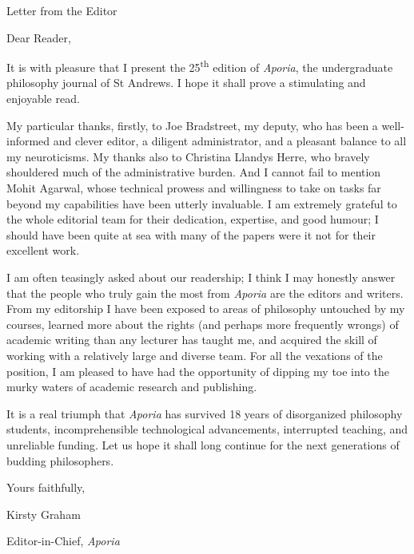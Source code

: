 \vspace*{\credgap}
{\noindent\LARGE\sc Letter from the Editor}
\vspace{\credgap}

\vspace{\ackgap}\noindent
Dear Reader,

\vspace{\credgap}\noindent
It is with pleasure that I present the 25\textsuperscript{th} edition
of \emph{Aporia}, the undergraduate philosophy journal of St Andrews.
I hope it shall prove a stimulating and enjoyable read.

My particular thanks, firstly, to Joe Bradstreet, my deputy, who has
been a well-informed and clever editor, a diligent administrator, and
a pleasant balance to all my neuroticisms. My thanks also to Christina
Llandys Herre, who bravely shouldered much of the administrative
burden.  And I cannot fail to mention Mohit Agarwal, whose technical
prowess and willingness to take on tasks far beyond my capabilities
have been utterly invaluable. I am extremely grateful to the whole
editorial team for their dedication, expertise, and good humour; I
should have been quite at sea with many of the papers were it not for
their excellent work.

I am often teasingly asked about our readership; I think I may honestly
answer that the people who truly gain the most from \emph{Aporia} are
the editors and writers. From my editorship I have been exposed to areas
of philosophy untouched by my courses, learned more about the rights
(and perhaps more frequently wrongs) of academic writing than any
lecturer has taught me, and acquired the skill of working with a
relatively large and diverse team. For all the vexations of the
position, I am pleased to have had the opportunity of dipping my toe
into the murky waters of academic research and publishing.

It is a real triumph that \emph{Aporia} has survived 18 years of
disorganized philosophy students, incomprehensible technological
advancements, interrupted teaching, and unreliable funding. Let us hope
it shall long continue for the next generations of budding philosophers.

\vspace{\credgap}\noindent
Yours faithfully,

\vspace{\ackgap}\noindent
Kirsty Graham

\noindent
Editor-in-Chief, \emph{Aporia}
